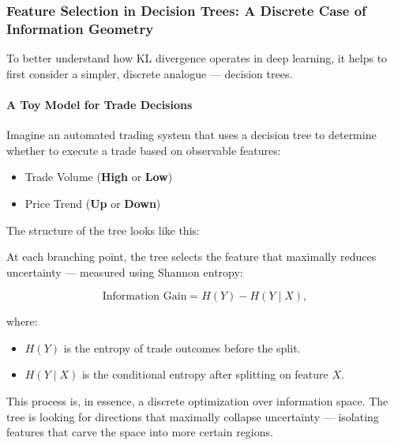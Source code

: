 \subsubsection{Feature Selection in Decision Trees: A Discrete Case of Information Geometry}

To better understand how KL divergence operates in deep learning, it helps to first consider a simpler, discrete analogue — decision trees.

\paragraph{A Toy Model for Trade Decisions}

Imagine an automated trading system that uses a decision tree to determine whether to execute a trade based on observable features:

\begin{itemize}
    \item Trade Volume (\textbf{High} or \textbf{Low})
    \item Price Trend (\textbf{Up} or \textbf{Down})
\end{itemize}

The structure of the tree looks like this:

\begin{center}
\end{center}

At each branching point, the tree selects the feature that maximally reduces uncertainty — measured using Shannon entropy:

\[
\text{Information Gain} = H(Y) - H(Y \mid X),
\]

where:
\begin{itemize}
    \item \( H(Y) \) is the entropy of trade outcomes before the split.
    \item \( H(Y \mid X) \) is the conditional entropy after splitting on feature \( X \).
\end{itemize}

This process is, in essence, a discrete optimization over information space. The tree is looking for directions that maximally collapse uncertainty — isolating features that carve the space into more certain regions.

